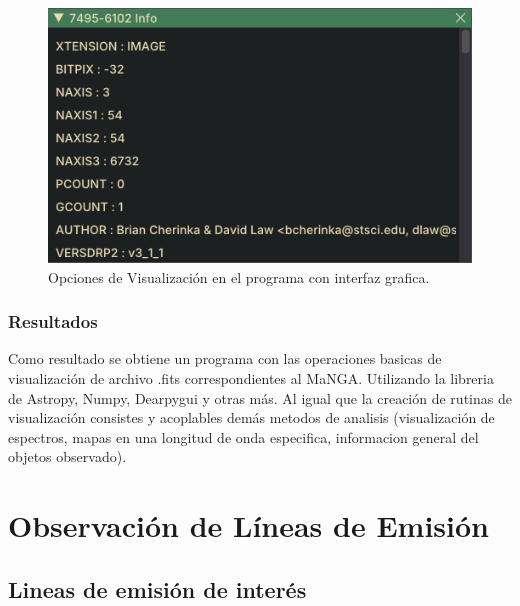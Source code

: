 \documentclass[9pt,twocolumn,a4paper]{opticajnl}
\begin{document}
\begin{figure}
    \includegraphics[width=0.8\linewidth]{moreinfo.png}
    \caption{Opciones de Visualización en el programa con interfaz grafica.}
    \label{fig:moreinfo}
\end{figure}

\subsubsection*{Resultados}
Como resultado se obtiene un programa con las operaciones basicas de visualización de archivo .fits correspondientes al MaNGA. Utilizando la libreria de Astropy, Numpy, Dearpygui y otras más. Al igual que la creación de rutinas de visualización consistes y acoplables demás metodos de analisis (visualización de espectros, mapas en una longitud de onda especifica, informacion general del objetos observado). 

\section*{Observación de Líneas de Emisión}
\subsection*{Lineas de emisión de interés}
\end{document}
